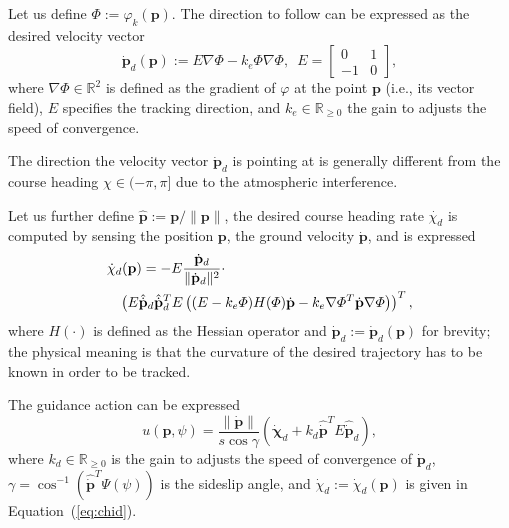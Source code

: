 \documentclass[letterpaper,10pt,conference]{ieeeconf}
\begin{document}
Let us define $\varPhi:=\varphi_k(\mathbf{p})$. The direction to follow can be expressed as the desired velocity vector
\begin{equation}\label{eq:pd}
  \dot{\mathbf{p}}_d(\mathbf{p}):=E\nabla\varPhi-k_e\varPhi\nabla\varPhi,\,\,\,E=\begin{bmatrix}
    0&1\\-1&0
  \end{bmatrix},
\end{equation}
where $\nabla\varPhi\in\mathbb{R}^2$ is defined as the gradient of $\varphi$ at the point $\mathbf{p}$ (i.e., its vector field), $E$ specifies the tracking direction, and $k_e\in\mathbb{R}_{\geq 0}$ the gain to adjusts the speed of convergence.

The direction the velocity vector $\dot{\mathbf{p}}_d$ is pointing at is generally different from the course heading $\chi\in(-\pi,\pi]$ due to the atmospheric interference.

Let us further define $\hat{\mathbf{p}}:=\mathbf{p}/\|\mathbf{p}\|$, the desired course heading rate $\dot{\chi_d}$ is computed by sensing the position $\mathbf{p}$, the ground velocity $\dot{\mathbf{p}}$, and is expressed
\begin{equation}\label{eq:chid}\begin{split}
  &\dot{\chi}_d(\mathbf{p})=-E\frac{\dot{\mathbf{p}}_d}{\|\dot{\mathbf{p}}_d\|^2}\cdot\\
  &\hspace{2ex}\left( E\hat{\dot{\mathbf{p}}}_d\hat{\dot{\mathbf{p}}}_d^TE\left( (E-k_e\varPhi)H(\varPhi)\dot{\mathbf{p}}-k_e\nabla\varPhi^T\dot{\mathbf{p}}\nabla\varPhi \right) \right)^T,
\end{split}
\end{equation} 
where $H(\cdot)$ is defined as the Hessian operator and $\dot{\mathbf{p}}_d:=\dot{\mathbf{p}}_d(\mathbf{p})$ for brevity; the physical meaning is that the curvature of the desired trajectory has to be known in order to be tracked.

The guidance action can be expressed
\begin{equation}\label{eq:uav-cont}
  u(\mathbf{p},\psi)=\frac{\|\dot{\mathbf{p}}\|}{s\cos{\gamma}}\left( \dot{\mathbf{\chi}}_d+k_d\hat{\dot{\mathbf{p}}}^TE\hat{\dot{\mathbf{p}}}_d \right),
\end{equation} 
where $k_d\in\mathbb{R}_{\geq 0}$ is the gain to adjusts the speed of convergence of $\dot{\mathbf{p}}_d$, $\gamma=\cos^{-1}{\left( \hat{\dot{\mathbf{p}}}^T\Psi(\psi) \right)}$ is the sideslip angle, and $\dot{\chi}_d:=\dot{\chi}_d(\mathbf{p})$ is given in Equation~(\ref{eq:chid}).
\end{document}
